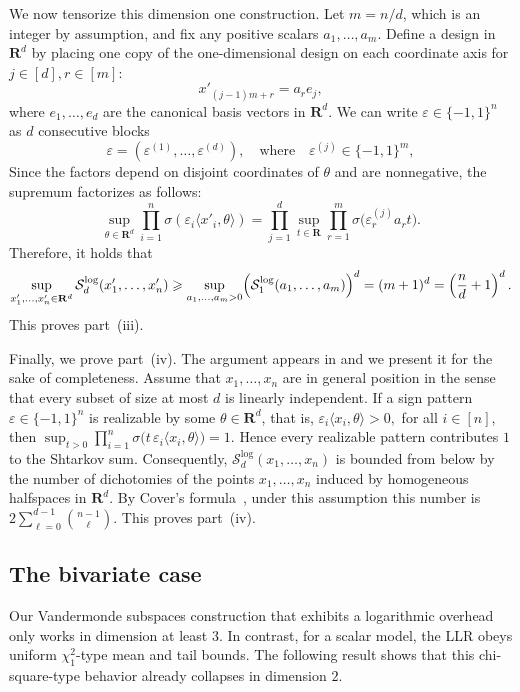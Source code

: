 \documentclass[11pt, letterpaper, hidelinks]{article}
\makeatletter
\renewcommand{\proofname}{\textit{\textbf{Proof}}}
\renewenvironment{proof}[1][\proofname]{\par\pushQED{\qed}\normalfont \topsep6\p@\@plus6\p@\relax\trivlist\item[\hskip\labelsep#1\@addpunct{}]\ignorespaces}{\popQED\endtrivlist\@endpefalse}
\newcommand{\R}{\mathbf R}
\newcommand{\1}{\mathbf 1}
\newcommand{\eps}{\varepsilon}
\renewcommand{\ge}{\geqslant}
\theoremstyle{plain}
\theoremstyle{definition}
\newcommand{\defn}{=}
\makeatother
\begin{document}
\begin{proof}
We now tensorize this dimension one construction. Let $m\defn n/d$, which is an integer by assumption, and fix any positive scalars $a_1,\dots,a_m$. Define a design in $\R^d$ by placing one copy of the one-dimensional design on each coordinate axis for $j \in [d], r \in [m]$:
\[
x'_{(j-1)m+r}\defn a_r e_j,
\]
where $e_1,\dots,e_d$ are the canonical basis vectors in $\R^d$. We can write  $\eps\in\{-1,1\}^n$ as $d$ consecutive blocks
\[
\eps=(\eps^{(1)},\dots,\eps^{(d)}),
\quad \textrm{where} \quad
\eps^{(j)}\in\{-1,1\}^m,
\]
Since the factors depend on disjoint coordinates of $\theta$ and are nonnegative, the supremum factorizes as follows:
\[
\sup_{\theta\in\R^d}\prod_{i=1}^n \sigma(\eps_i \langle x'_i,\theta\rangle)
=
\prod_{j=1}^d
\sup_{t\in\R}\prod_{r=1}^m \sigma\bigl(\eps_r^{(j)} a_r t\bigr).
\]
Therefore, it holds that
\[
\sup_{x'_1,\dots,x'_n\in\R^d}\mathcal S_d^{\operatorname{log}}(x'_1,\dots,x'_n)
\ge
\sup_{a_1,\dots,a_m>0}
\Bigl(\mathcal S_1^{\operatorname{log}}(a_1,\dots,a_m)\Bigr)^d
=
(m+1)^d
=
\left(\frac nd+1\right)^d.
\]
This proves part~(iii).

Finally, we prove part~(iv). The argument appears in \cite{DrmotaJacquetWuSzpankowski2024} and we present it for the sake of completeness. Assume that $x_1,\dots,x_n$ are in general position in the sense that every subset of size at most $d$ is linearly independent. If a sign pattern $\eps\in\{-1,1\}^n$ is realizable by some $\theta\in\R^d$, that is,
$
\eps_i \langle x_i,\theta\rangle >0,$  for all $i \in [n]$,
then
$
\sup_{t>0}\prod_{i=1}^n \sigma\bigl(t\,\eps_i\langle x_i,\theta\rangle\bigr)=1.
$
Hence every realizable pattern contributes $1$ to the Shtarkov sum. Consequently,
$
\mathcal{S}_d^{\operatorname{log}}(x_1,\dots,x_n)
$
is bounded from below by the number of dichotomies of the points $x_1,\dots,x_n$ induced by homogeneous halfspaces in $\R^d$. By Cover's formula~\cite{Cover1965}, under this assumption this number is
$
2\sum_{\ell=0}^{d-1}\binom{n-1}{\ell}.
$
This proves part~(iv).
\end{proof}



\subsection{The bivariate case}
\label{sec:bivariatecase}


Our Vandermonde subspaces construction that exhibits a logarithmic overhead only works in dimension at least $3$. In contrast, for a scalar model, the LLR obeys uniform $\chi_1^2$-type mean and tail bounds. The following result shows that this chi-square-type behavior already collapses in dimension $2$. 
\end{document}
